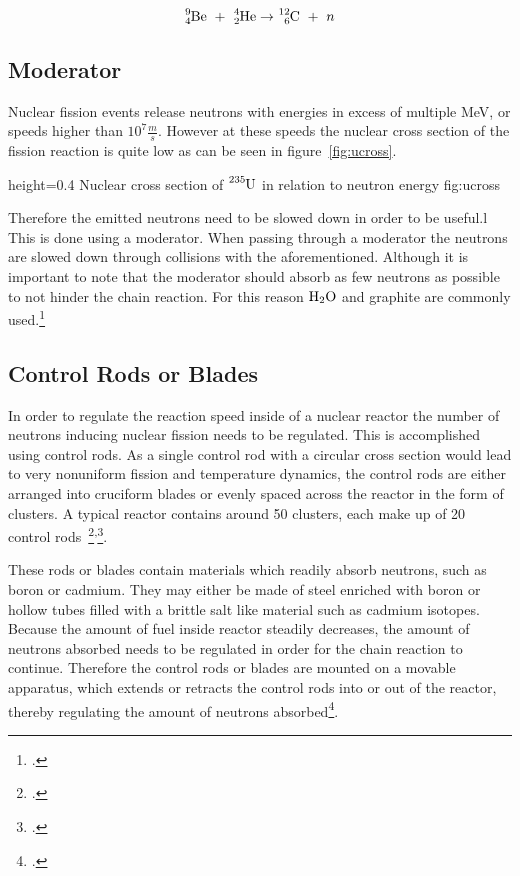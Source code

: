 \begin{equation}
    \label{neut}
    \ce{^{9}_{4}Be} ~+~ \ce{^{4}_{2}He} \rightarrow \ce{^{12}_{6}C} ~+~ n
\end{equation}

\pagebreak
\subsection{Moderator}
Nuclear fission events release neutrons with energies in excess of multiple MeV, or speeds higher
than $10^{7} \frac{m}{s}$. However at these speeds the nuclear cross section of the fission reaction
is quite low as can be seen in figure~\ref{fig:ucross}.

  {height=0.4\textheight}%
  {Nuclear cross section of $\ce{^{235}U}$ in relation to neutron energy}%
  {}%
  {fig:ucross}%

  Therefore the emitted neutrons need to be slowed down in order to be useful.l
  This is done using a moderator. When passing through a moderator the neutrons are slowed down through
  collisions with the aforementioned. Although it is important to note that the moderator should absorb
  as few neutrons as possible to not hinder the chain reaction. For this reason $\ce{H_{2}O}$ 
  and graphite are commonly used.\footcite[28]{ReactorPhysics}

\subsection{Control Rods or Blades}
In order to regulate the reaction speed inside of a nuclear reactor the number of neutrons inducing
nuclear fission needs to be regulated. This is accomplished using control rods.
As a single control rod with a circular cross section would lead to very nonuniform fission and
temperature dynamics, the control rods are either arranged into cruciform blades or evenly spaced
across the reactor in the form of clusters. A typical reactor contains around 50 clusters, each
make up of 20 control rods~\footcite[72]{ReactorPhysics}\textsuperscript{,}\footcite{grayson}.

These rods or blades contain materials which readily absorb neutrons, such as boron or cadmium. %
They may either be made of steel enriched with boron or hollow tubes filled with a brittle salt like material such as cadmium isotopes.
Because the amount of fuel inside reactor steadily decreases, the amount of neutrons absorbed needs to
be regulated in order for the chain reaction to continue. Therefore the control rods or blades are
mounted on a movable apparatus, which extends or retracts the control rods into or out of the reactor,
thereby regulating the amount of neutrons absorbed\footcite{grayson}.

